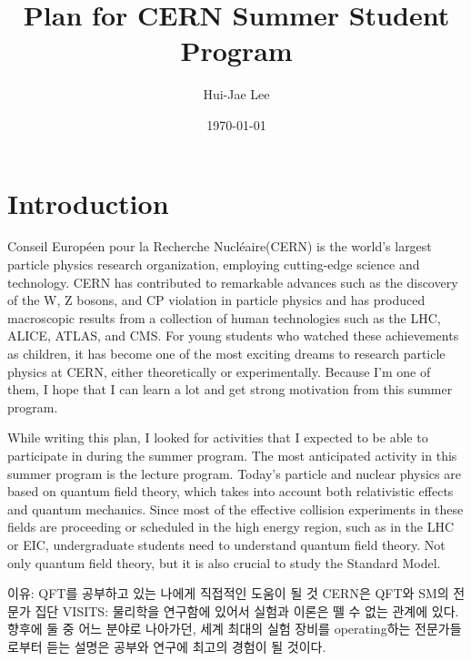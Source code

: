 \documentclass[aps,superscriptaddress,11pt]{revtex4-2}
\begin{document}
\title{Plan for CERN Summer Student Program}

\author{Hui-Jae Lee}


\date{\today}

 \maketitle
 
\section{Introduction}
Conseil Européen pour la Recherche Nucléaire(CERN) is the world's largest particle 
physics research organization, employing cutting-edge science and technology. 
CERN has contributed to remarkable advances such as the discovery of the W, Z bosons, 
and CP violation in particle physics and has produced macroscopic results from a 
collection of human technologies such as the LHC, ALICE, ATLAS, and CMS. For young 
students who watched these achievements as children, it has become one of the most 
exciting dreams to research particle physics at CERN, either theoretically or 
experimentally. Because I'm one of them, I hope that I can learn a lot and get 
strong motivation from this summer program.


While writing this plan, I looked for activities that 
I expected to be able to participate in during the summer program.
The most anticipated activity in this summer program is the 
lecture program. 
Today's particle and nuclear physics are based on quantum field theory, 
which takes into account both relativistic effects and quantum mechanics.
Since most of the effective collision experiments in these fields are proceeding 
or scheduled in the high energy region, such as in the LHC or EIC, undergraduate 
students need to understand quantum field theory. Not only quantum field theory, 
but it is also crucial to study the Standard Model.

이유: QFT를 공부하고 있는 나에게 직접적인 도움이 될 것
CERN은 QFT와 SM의 전문가 집단
VISITS: 물리학을 연구함에 있어서 실험과 이론은 뗄 수 없는 관계에 있다. 
향후에 둘 중 어느 분야로 나아가던, 세계 최대의 실험 장비를 operating하는 
전문가들로부터 듣는 설명은 공부와 연구에 최고의 경험이 될 것이다.



\vfill
\end{document}
